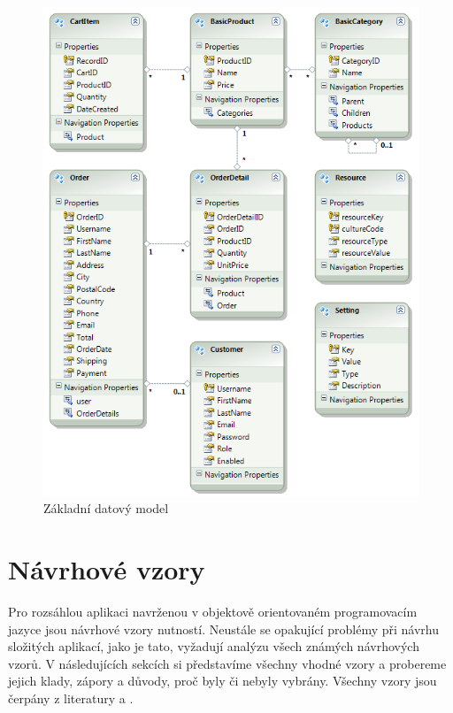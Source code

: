 \documentclass[11pt,twoside,a4paper]{book}
\begin{document}
\begin{figure}[h!]
\begin{center}
\includegraphics[scale=1]{figures/datamodel}
\caption{Základní datový model}
\label{fig:datamodel}
\end{center}
\end{figure}


\section{Návrhové vzory}

Pro rozsáhlou aplikaci navrženou v objektově orientovaném programovacím jazyce jsou návrhové vzory nutností. Neustále se opakující problémy při návrhu složitých aplikací, jako je tato, vyžadují analýzu všech známých návrhových vzorů. V následujících sekcích si představíme všechny vhodné vzory a probereme jejich klady, zápory a důvody, proč byly či nebyly vybrány. Všechny vzory jsou čerpány z literatury \cite{GOF} a \cite{PEAA}.
\end{document}
